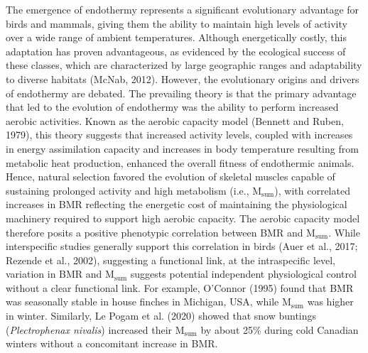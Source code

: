 \documentclass[10pt, twoside]{book} %
\begin{document}
\noindent The emergence of endothermy represents a significant evolutionary advantage for birds and mammals, giving them the ability to maintain high levels of activity over a wide range of ambient temperatures. Although energetically costly, this adaptation has proven advantageous, as evidenced by the ecological success of these classes, which are characterized by large geographic ranges and adaptability to diverse habitats (McNab, 2012). However, the evolutionary origins and drivers of endothermy are debated. The prevailing theory is that the primary advantage that led to the evolution of endothermy was the ability to perform increased aerobic activities. Known as the aerobic capacity model (Bennett and Ruben, 1979), this theory suggests that increased activity levels, coupled with increases in energy assimilation capacity and increases in body temperature resulting from metabolic heat production, enhanced the overall fitness of endothermic animals. Hence, natural selection favored the evolution of skeletal muscles capable of sustaining prolonged activity and high metabolism (i.e., M$_{\text{sum}}$), with correlated increases in BMR reflecting the energetic cost of maintaining the physiological machinery required to support high aerobic capacity. The aerobic capacity model therefore posits a positive phenotypic correlation between BMR and M$_{\text{sum}}$. While interspecific studies generally support this correlation in birds (Auer et al., 2017; Rezende et al., 2002), suggesting a functional link, at the intraspecific level, variation in BMR and M$_{\text{sum}}$ suggests potential independent physiological control without a clear functional link. For example, O'Connor (1995) found that BMR was seasonally stable in house finches in Michigan, USA, while M$_{\text{sum}}$ was higher in winter. Similarly, Le Pogam et al. (2020) showed that snow buntings (\textit{Plectrophenax nivalis}) increased their M$_{\text{sum}}$ by about 25\% during cold Canadian winters without a concomitant increase in BMR.\\
\end{document}
